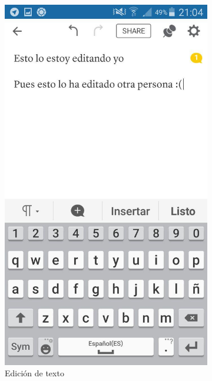 \begin{figure}[H]
\begin{subfigure}[b]{0.3\textwidth}
                \includegraphics[width=\textwidth]{Media/Captures/quipEdit.jpg}
                \caption{Edición de texto}
                \label{fig:quipText}
        \end{subfigure}
        ~
        \begin{subfigure}[b]{0.3\textwidth}

\end{subfigure}
\end{figure}
